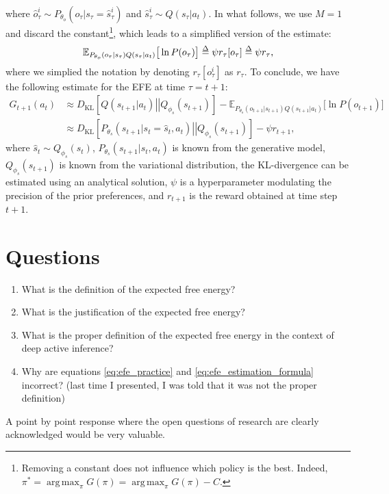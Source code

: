 \documentclass[twoside,11pt]{article}
\newcommand{\kl}[2]{D_{\mathrm{KL}} \left[ \left. \left. #1 \right|\right| #2 \right] }
\DeclareMathOperator*{\argmax}{arg\,max}
\def\delequal{\mathrel{\ensurestackMath{\stackon[1pt]{=}{\scriptstyle\Delta}}}}
\begin{document}
where $\hat{o}_\tau^i \sim P_{\theta_o}(o_\tau|s_\tau=\hat{s}_\tau^i)$ and $\hat{s}_\tau^i \sim Q(s_\tau | a_t)$. In what follows, we use $M=1$ and discard the constant\footnote{Removing a constant does not influence which policy is the best. Indeed, $\pi^* = \argmax_\pi G(\pi) = \argmax_\pi G(\pi) - C$.}, which leads to a simplified version of the estimate:
\begin{align*}
\mathbb{E}_{P_{\theta_o}(o_\tau|s_\tau)Q(s_\tau | a_t)}\big[\ln P(o_\tau)\big] \delequal \psi r_\tau[o_\tau] \delequal \psi r_\tau,
\end{align*}
where we simplied the notation by denoting $r_\tau[o_\tau^i]$ as $r_\tau$. To conclude, we have the following estimate for the EFE at time $\tau = t+1$:
\begin{align}
G_{t+1}(a_t) &\approx \kl{Q(s_{t+1} | a_t)}{Q_{\phi_s}(s_{t+1})} - \mathbb{E}_{P_{\theta_o}(o_{t+1}|s_{t+1})Q(s_{t+1} | a_t)}\big[\ln P(o_{t+1})\big]\nonumber\\
&\approx \kl{P_{\theta_s}(s_{t+1}|s_t = \hat{s}_t, a_t)}{Q_{\phi_s}(s_{t+1})} - \psi r_{t+1},\label{eq:efe_estimation_formula}
\end{align}
where $\hat{s}_t \sim Q_{\phi_s}(s_t)$, $P_{\theta_s}(s_{t+1}|s_t, a_t)$ is known from the generative model, $Q_{\phi_s}(s_{t+1})$ is known from the variational distribution, the KL-divergence can be estimated using an analytical solution, $\psi$ is a hyperparameter modulating the precision of the prior preferences, and $r_{t+1}$ is the reward obtained at time step $t+1$.

\section{Questions} \label{sec:Questions}

\begin{enumerate}
\item What is the definition of the expected free energy?
\item What is the justification of the expected free energy?
\item What is the proper definition of the expected free energy in the context of deep active inference?
\item Why are equations \eqref{eq:efe_practice} and \eqref{eq:efe_estimation_formula} incorrect? (last time I presented, I was told that it was not the proper definition)
\end{enumerate}

\noindent A point by point response where the open questions of research are clearly acknowledged would be very valuable.


\vskip 0.2in

\end{document}
